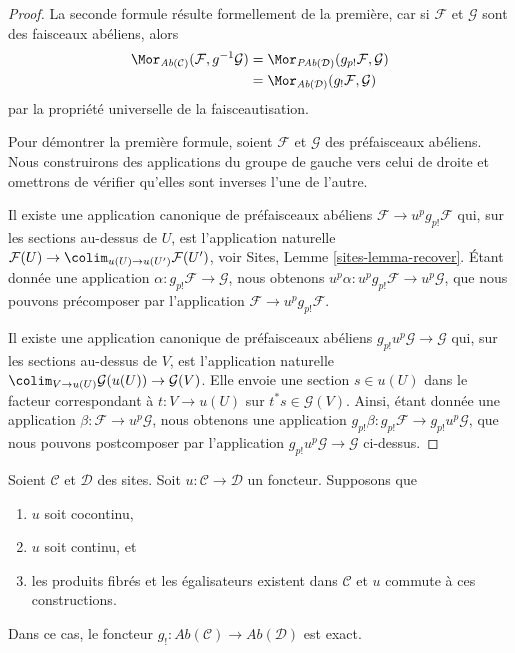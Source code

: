 \begin{proof}
La seconde formule résulte formellement de la première, car si $\mathcal{F}$ et
$\mathcal{G}$ sont des faisceaux abéliens, alors
\begin{align*}
\Mor_{\textit{Ab}(\mathcal{C})}(\mathcal{F}, g^{-1}\mathcal{G})
& =
\Mor_{\textit{PAb}(\mathcal{D})}(g_{p!}\mathcal{F}, \mathcal{G}) \\
& =
\Mor_{\textit{Ab}(\mathcal{D})}(g_!\mathcal{F}, \mathcal{G})
\end{align*}
par la propriété universelle de la faisceautisation.

\medskip\noindent
Pour démontrer la première formule, soient $\mathcal{F}$ et $\mathcal{G}$ des
préfaisceaux abéliens. Nous construirons des applications du groupe de gauche
vers celui de droite et omettrons de vérifier qu'elles sont inverses l'une de
l'autre.

\medskip\noindent
Il existe une application canonique de préfaisceaux abéliens
$\mathcal{F} \to u^pg_{p!}\mathcal{F}$ qui, sur les sections au-dessus de $U$,
est l'application naturelle
$\mathcal{F}(U) \to \colim_{u(U) \to u(U')} \mathcal{F}(U')$, voir Sites,
Lemme \ref{sites-lemma-recover}.
Étant donnée une application $\alpha : g_{p!}\mathcal{F} \to \mathcal{G}$,
nous obtenons $u^p\alpha : u^pg_{p!}\mathcal{F} \to u^p\mathcal{G}$, que nous
pouvons précomposer par l'application
$\mathcal{F} \to u^pg_{p!}\mathcal{F}$.

\medskip\noindent
Il existe une application canonique de préfaisceaux abéliens
$g_{p!}u^p\mathcal{G} \to \mathcal{G}$ qui, sur les sections au-dessus de $V$,
est l'application naturelle
$\colim_{V \to u(U)} \mathcal{G}(u(U)) \to \mathcal{G}(V)$.
Elle envoie une section $s \in u(U)$ dans le facteur correspondant
à $t : V \to u(U)$ sur $t^*s \in \mathcal{G}(V)$. Ainsi, étant donnée une
application $\beta : \mathcal{F} \to u^p\mathcal{G}$, nous obtenons une
application $g_{p!}\beta : g_{p!}\mathcal{F} \to g_{p!}u^p\mathcal{G}$, que
nous pouvons postcomposer par l'application
$g_{p!}u^p\mathcal{G} \to \mathcal{G}$ ci-dessus.
\end{proof}

\begin{lemma}
\label{lemma-exactness-lower-shriek}
Soient $\mathcal{C}$ et $\mathcal{D}$ des sites. Soit
$u : \mathcal{C} \to \mathcal{D}$ un foncteur. Supposons que
\begin{enumerate}
\item[(a)] $u$ soit cocontinu,
\item[(b)] $u$ soit continu, et
\item[(c)] les produits fibrés et les égalisateurs existent dans
$\mathcal{C}$ et $u$ commute à ces constructions.
\end{enumerate}
Dans ce cas, le foncteur
$g_! : \textit{Ab}(\mathcal{C}) \to \textit{Ab}(\mathcal{D})$
est exact.
\end{lemma}

